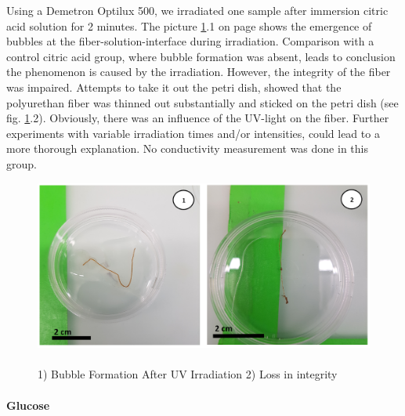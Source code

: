 Using a Demetron Optilux 500, we irradiated one sample after immersion  citric acid solution for 2 minutes. The picture \ref{fig:BubblyAndSad}.1 on page \pageref{fig:BubblyAndSad} shows the emergence of bubbles at the fiber-solution-interface during irradiation. Comparison with a control citric acid group, where bubble formation was absent, leads to conclusion the phenomenon is caused by the irradiation. However, the integrity of the fiber was impaired. Attempts to take it out the petri dish, showed that the polyurethan fiber was thinned out substantially and sticked on the petri dish (see fig. \ref{fig:BubblyAndSad}.2).  Obviously, there was an influence of the UV-light on the fiber. Further experiments with variable irradiation times and/or intensities, could lead to a more thorough explanation. No conductivity measurement was done in this group.

 \begin{figure}[H]
	\centerline{\includegraphics[width=\textwidth]{./pic/BubbleAndSad.PNG}}
	\caption{\\
		1) Bubble Formation After UV Irradiation 2) Loss in integrity}
	\label{fig:BubblyAndSad}
\end{figure}
\vfill \newpage


\paragraph{Glucose}

